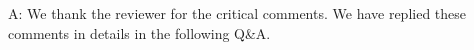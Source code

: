 \documentclass[utf8]{article}
\newenvironment{ans}  
    {\color{Black}\noindent A:}
    {~\newline}
\newcommand{\revise}[3]{
	\newline
	\newline
    \noindent
    \textbf{Line #1:}
    \newline
    Original:\newline
    \textit{"#2"}
    \newline
    \newline
    Revised:\newline
    \textit{"#3"}\newline}
\begin{document}
    
    	\begin{ans}
    		We thank the reviewer for the critical comments. We have replied these comments in details in the following Q\&A. 
%    			
%    			
%    			
%    			
%    			

\end{ans}
\end{document}
